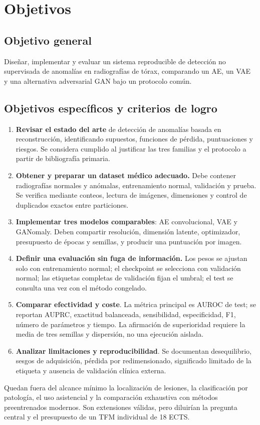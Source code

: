 \section{Objetivos}

\subsection{Objetivo general}

Diseñar, implementar y evaluar un sistema reproducible de detección no
supervisada de anomalías en radiografías de tórax, comparando un AE, un VAE y
una alternativa adversarial GAN bajo un protocolo común.

\subsection{Objetivos específicos y criterios de logro}

\begin{enumerate}
  \item \textbf{Revisar el estado del arte} de detección de anomalías basada en
  reconstrucción, identificando supuestos, funciones de pérdida, puntuaciones y
  riesgos. Se considera cumplido al justificar las tres familias y el protocolo
  a partir de bibliografía primaria.

  \item \textbf{Obtener y preparar un dataset médico adecuado.} Debe contener
  radiografías normales y anómalas, entrenamiento normal, validación y prueba.
  Se verifica mediante conteos, lectura de imágenes, dimensiones y control de
  duplicados exactos entre particiones.

  \item \textbf{Implementar tres modelos comparables}: AE convolucional, VAE y
  GANomaly. Deben compartir resolución, dimensión latente, optimizador,
  presupuesto de épocas y semillas, y producir una puntuación por imagen.

  \item \textbf{Definir una evaluación sin fuga de información.} Los pesos se
  ajustan solo con entrenamiento normal; el checkpoint se selecciona con
  validación normal; las etiquetas completas de validación fijan el umbral; el
  test se consulta una vez con el método congelado.

  \item \textbf{Comparar efectividad y coste}. La métrica principal es AUROC de
  test; se reportan AUPRC, exactitud balanceada, sensibilidad, especificidad,
  F1, número de parámetros y tiempo. La afirmación de superioridad requiere la
  media de tres semillas y dispersión, no una ejecución aislada.

  \item \textbf{Analizar limitaciones y reproducibilidad}. Se documentan
  desequilibrio, sesgos de adquisición, pérdida por redimensionado, significado
  limitado de la etiqueta y ausencia de validación clínica externa.
\end{enumerate}

Quedan fuera del alcance mínimo la localización de lesiones, la clasificación
por patología, el uso asistencial y la comparación exhaustiva con métodos
preentrenados modernos. Son extensiones válidas, pero diluirían la pregunta
central y el presupuesto de un TFM individual de 18 ECTS.
